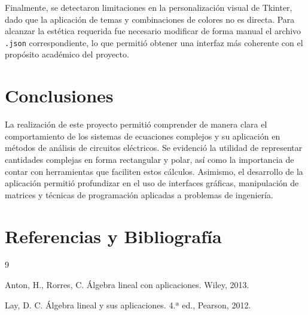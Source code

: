 \documentclass[12pt,a4paper]{article}
\begin{document}
Finalmente, se detectaron limitaciones en la personalización visual de Tkinter, dado que la aplicación de temas y combinaciones de colores no es directa. Para alcanzar la estética requerida fue necesario modificar de forma manual el archivo \texttt{.json} correspondiente, lo que permitió obtener una interfaz más coherente con el propósito académico del proyecto.


\section{Conclusiones}

La realización de este proyecto permitió comprender de manera clara el comportamiento de los sistemas de ecuaciones complejos y su aplicación en métodos de análisis de circuitos eléctricos. Se evidenció la utilidad de representar cantidades complejas en forma rectangular y polar, así como la importancia de contar con herramientas que faciliten estos cálculos. Asimismo, el desarrollo de la aplicación permitió profundizar en el uso de interfaces gráficas, manipulación de matrices y técnicas de programación aplicadas a problemas de ingeniería.

\section{Referencias y Bibliografía}
\renewcommand{\refname}{} %

\begin{thebibliography}{9}
\setlength{\labelwidth}{0pt}
\setlength{\labelsep}{0.15cm}
\setlength{\leftmargin}{0.63cm}
\setlength{\itemindent}{-0.63cm}

Anton, H., Rorres, C. Álgebra lineal con aplicaciones. Wiley, 2013.

Lay, D. C. Álgebra lineal y sus aplicaciones. 4.ª ed., Pearson, 2012.

\end{thebibliography}
\end{document}

